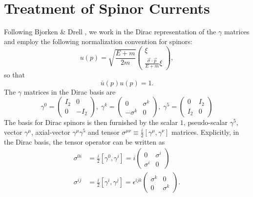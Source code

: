\documentclass[12pt,letterpaper]{book}
\begin{document}
\chapter{Treatment of Spinor Currents}
\label{app:spinor_expansion}
\thispagestyle{headings}
Following Bjorken \& Drell \cite{Bjorken:1965sts}, we work in the Dirac representation of the $\gamma$ matrices and employ the following normalization convention for spinors:
\begin{equation}
u(p)=\sqrt{\frac{E+m}{2m}}\left(\begin{array}{c}
\xi\\
\frac{\vec{\sigma}\cdot\vec{p}}{E+m}\xi
\end{array}\right),
\end{equation}
so that
\begin{equation}
\bar{u}(p)u(p)=1.
\end{equation}
The $\gamma$ matrices in the Dirac basis are
\begin{equation}
\gamma^0=\left(\begin{array}{cc}
I_2 & 0 \\
0 & -I_2
\end{array}\right),\;\gamma^k=\left(\begin{array}{cc}
0 & \sigma^k\\
-\sigma^k & 0
\end{array}\right),\;\gamma^5=\left(\begin{array}{cc}
0 & I_2\\
I_2 & 0
\end{array}\right)
\end{equation}
The basis for Dirac spinors is then furnished by the scalar $1$, pseudo-scalar $\gamma^5$, vector $\gamma^{\mu}$, axial-vector $\gamma^{\mu}\gamma^5$ and tensor $\sigma^{\mu\nu}\equiv \frac{i}{2}\left[\gamma^{\mu},\gamma^{\nu}\right]$ matrices. Explicitly, in the Dirac basis, the tensor operator can be written as
\begin{equation}
\begin{split}
\sigma^{0i}&=\frac{i}{2}\left[\gamma^0,\gamma^i\right]=i\left(\begin{array}{cc}
0 & \sigma^i\\
\sigma^i & 0
\end{array}\right)\\
\sigma^{ij}&=\frac{i}{2}\left[\gamma^i,\gamma^j\right]=\epsilon^{ijk}\left(\begin{array}{cc}
\sigma^k & 0\\
0 & \sigma^k
\end{array}\right).
\end{split}
\end{equation}
\end{document}
